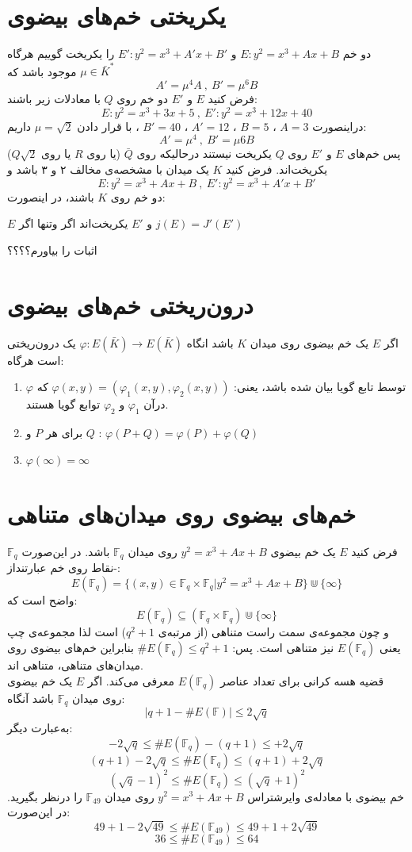 \section{یکریختی خم‌های بیضوی}
دو خم 
$E:y^2=x^3+Ax+B$
و
$E': y^2=x^3+A'x+B'$
را یکریخت گوییم هرگاه
$\mu \in {\bar{K}}^*$
موجود باشد که
$$ A'={\mu}^4A ~,~ B'={\mu}^6B $$
\example
فرض کنید
$E$
و
$E'$
دو خم روی 
$Q$
با معادلات زیر باشند:
$$ E:y^2=x^3+3x+5 ~,~  E':y^2=x^3+12x+40$$
دراینصورت
$A=3$
،
$B=5$
،
$A'=12$
،
$B'=40$
، با قرار دادن
$\mu = \sqrt{2}$
داریم:
$$ A'={\mu}^4 ~,~ B'={\mu}6B$$
پس خم‌های 
$E$
و
$E'$
روی
$Q$
 یکریخت نیستند درحالیکه روی
$\bar{Q}$
(یا روی 
$R$
یا روی
$Q\sqrt{2}$)
یکریخت‌اند.
\theorem
فرض کنید
$K$
یک میدان با مشخصه‌ی مخالف ۲ و ۳ باشد و 
$$ E:y^2=x^3+Ax+B ~,~ E': y^2=x^3+A'x+B' $$
دو خم روی
$K$
باشند، در اینصورت:
\begin{center}
$E$
و
$E'$
یکریخت‌اند اگر وتنها اگر 
$j(E)=J'(E')$
\end{center}
اثبات را بیاورم؟؟؟؟
\section{درون‌ریختی خم‌های بیضوی}

اگر
$E$
یک خم بیضوی روی میدان
$K$
باشد انگاه
$\varphi : E(\bar{K}) \rightarrow E(\bar{K})$
یک درون‌ریختی است هرگاه:
\begin{enumerate}
\item{
$\varphi$
توسط تابع گویا بیان شده باشد، یعنی:
$\varphi(x,y) = (\varphi_1(x,y) , \varphi_2(x,y) )$
که درآن
$\varphi_1$
و
$\varphi_2$
توابع گویا هستند.
}
\item{
برای هر
$P$
و
$Q$
:
$\varphi(P+Q) = \varphi(P)+\varphi(Q)$
}
\item{
$\varphi(\infty) = \infty$
}
\end{enumerate}

\section{خم‌های بیضوی روی میدان‌های متناهی}

فرض کنید
$E$
یک خم بیضوی
$y^2=x^3+Ax+B$
روی میدان
$\mathbb{F}_q$
باشد. در این‌صورت 
$\mathbb{F}_q$-نقاط
روی خم عبارتنداز:
$$
 E(\mathbb{F}_q) = \{ (x,y) \in \mathbb{F}_q \times \mathbb{F}_q | y^2=x^3+Ax+B \} 
\Cup \{ \infty \}
$$
واضح است که:
$$ E(\mathbb{F}_q) \subseteq (\mathbb{F}_q \times \mathbb{F}_q) \Cup \{ \infty \} $$
و چون مجموعه‌ی سمت راست متناهی (از مرتبه‌ی
$q^2+1$)
است لذا مجموعه‌ی چپ یعنی
$E(\mathbb{F}_q)$
نیز متناهی است. پس:
$\# E(\mathbb{F}_q) \leq q^2+1$
بنابراین خم‌های بیضوی روی میدان‌های متناهی، متناهی اند.
\\
قضیه هسه کرانی برای تعداد عناصر 
$E(\mathbb{F}_q)$
معرفی می‌کند.
\theorem
اگر
$E$
یک خم بیضوی روی میدان
$\mathbb{F}_q$
باشد آنگاه:
$$ | q+1- \#E(\mathbb{F}) | \leq 2\sqrt{q} $$
به‌عبارت دیگر:
$$ -2\sqrt{q} \leq \# E(\mathbb{F}_q)  -(q+1) \leq +2\sqrt{q}$$
$$ (q+1)-2\sqrt{q} \leq \# E(\mathbb{F}_q) \leq (q+1)+2\sqrt{q}$$
$$ (\sqrt{q}-1)^2 \leq \# E(\mathbb{F}_q) \leq (\sqrt{q}+1)^2$$
\example
خم بیضوی با معادله‌ی وایرشتراس
$y^2=x^3+Ax+B$
روی میدان
$\mathbb{F}_{49}$
را درنظر بگیرید. در این‌صورت:
$$ 49+1-2\sqrt{49} \leq \# E(\mathbb{F}_{49}) \leq 49+1+2\sqrt{49}$$
$$ 36 \leq \# E(\mathbb{F}_{49}) \leq 64$$

